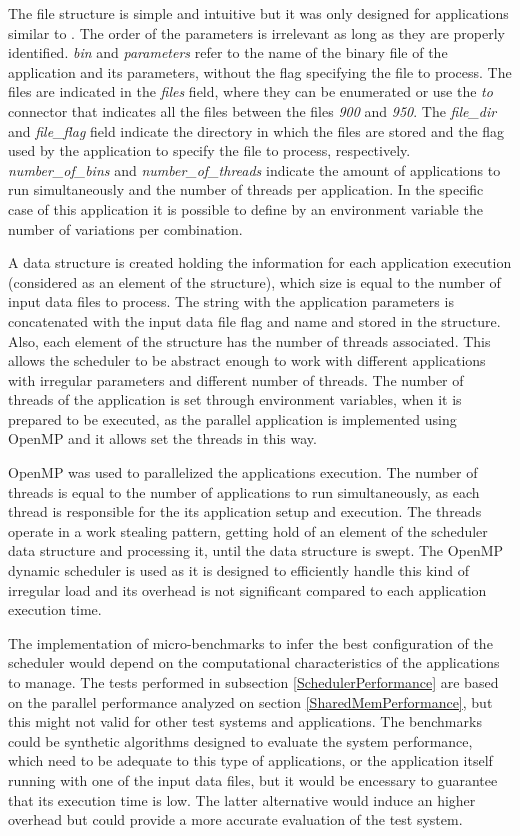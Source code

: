 The file structure is simple and intuitive but it was only designed for applications similar to \tth. The order of the parameters is irrelevant as long as they are properly identified. \textit{bin} and \textit{parameters} refer to the name of the binary file of the application and its parameters, without the flag specifying the file to process. The files are indicated in the \textit{files} field, where they can be enumerated or use the \textit{to} connector that indicates all the files between the files \textit{900} and \textit{950}. The \textit{file\_dir} and \textit{file\_flag} field indicate the directory in which the files are stored and the flag used by the application to specify the file to process, respectively. \textit{number\_of\_bins} and \textit{number\_of\_threads} indicate the amount of applications to run simultaneously and the number of threads per application. In the specific case of this application it is possible to define by an environment variable the number of variations per combination.

A data structure is created holding the information for each application execution (considered as an element of the structure), which size is equal to the number of input data files to process. The string with the application parameters is concatenated with the input data file flag and name and stored in the structure. Also, each element of the structure has the number of threads associated. This allows the scheduler to be abstract enough to work with different applications with irregular parameters and different number of threads. The number of threads of the application is set through environment variables, when it is prepared to be executed, as the parallel \tth application is implemented using OpenMP and it allows set the threads in this way.

OpenMP was used to parallelized the applications execution. The number of threads is equal to the number of applications to run simultaneously, as each thread is responsible for the its application setup and execution. The threads operate in a work stealing pattern, getting hold of an element of the scheduler data structure and processing it, until the data structure is swept. The OpenMP dynamic scheduler is used as it is designed to efficiently handle this kind of irregular load and its overhead is not significant compared to each application execution time.

The implementation of micro-benchmarks to infer the best configuration of the scheduler would depend on the computational characteristics of the applications to manage. The tests performed in subsection \ref{SchedulerPerformance} are based on the parallel \tth performance analyzed on section \ref{SharedMemPerformance}, but this might not valid for other test systems and applications. The benchmarks could be synthetic algorithms designed to evaluate the system performance, which need to be adequate to this type of applications, or the application itself running with one of the input data files, but it would be encessary to guarantee that its execution time is low. The latter alternative would induce an higher overhead but could provide a more accurate evaluation of the test system.

